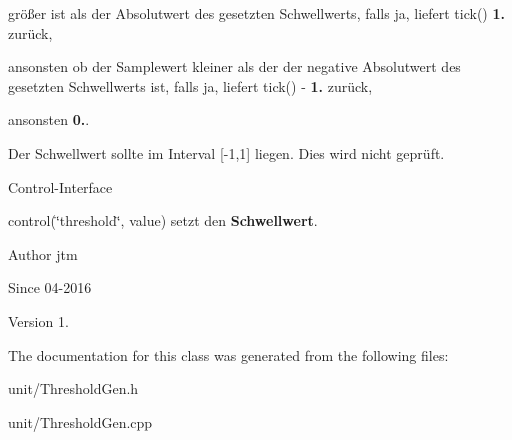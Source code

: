\begin{DoxyItemize}
\item größer ist als der Absolutwert des gesetzten Schwellwerts, falls ja, liefert tick() {\bfseries 1.} zurück,
\item ansonsten ob der Samplewert kleiner als der der negative Absolutwert des gesetzten Schwellwerts ist, falls ja, liefert tick() -\/ {\bfseries 1.} zurück,
\item ansonsten {\bfseries 0.}.
\end{DoxyItemize}

Der Schwellwert sollte im Interval \mbox{[}-\/1,1\mbox{]} liegen. Dies wird nicht geprüft.

Control-\/\+Interface


\begin{DoxyItemize}
\item control(\char`\"{}threshold\char`\"{}, value) setzt den {\bfseries Schwellwert}.
\end{DoxyItemize}

\begin{DoxyAuthor}{Author}
jtm 
\end{DoxyAuthor}
\begin{DoxySince}{Since}
04-\/2016 
\end{DoxySince}
\begin{DoxyVersion}{Version}
1. 
\end{DoxyVersion}


The documentation for this class was generated from the following files\+:\begin{DoxyCompactItemize}
\item 
unit/Threshold\+Gen.\+h\item 
unit/Threshold\+Gen.\+cpp\end{DoxyCompactItemize}
